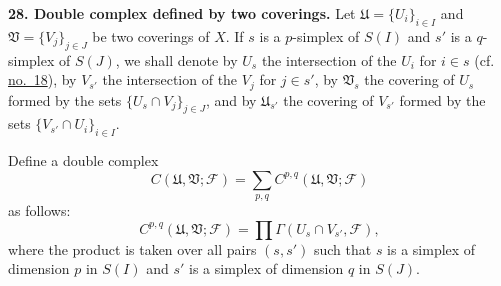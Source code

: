 
\medskip
{}\label{fac:I:4:no:28}
\textbf{28. Double complex defined by two coverings.}
Let $\mathfrak{U}=\{U_i\}_{i\in I}$ and $\mathfrak{V}=\{V_j\}_{j\in J}$ be two coverings of $X$. If $s$ is a $p$-simplex of $S(I)$ and $s'$ is a $q$-simplex of $S(J)$, we shall denote by $U_s$ the intersection of the $U_i$ for $i\in s$ (cf. \hyperref[fac:I:3:no:18]{no.~18}), by $V_{s'}$ the intersection of the $V_j$ for $j\in s'$, by $\mathfrak{V}_s$ the covering of $U_s$ formed by the sets $\{U_s\cap V_j\}_{j\in J}$, and by $\mathfrak{U}_{s'}$ the covering of $V_{s'}$ formed by the sets $\{V_{s'}\cap U_i\}_{i\in I}$.

Define a double complex
\[
C(\mathfrak{U},\mathfrak{V};\mathcal{F})
=\sum_{p,q}C^{p,q}(\mathfrak{U},\mathfrak{V};\mathcal{F})
\]
as follows:
\[
C^{p,q}(\mathfrak{U},\mathfrak{V};\mathcal{F})
=\prod\Gamma(U_s\cap V_{s'},\mathcal{F}),
\]
where the product is taken over all pairs $(s,s')$ such that $s$ is a simplex of dimension $p$ in $S(I)$ and $s'$ is a simplex of dimension $q$ in $S(J)$.

